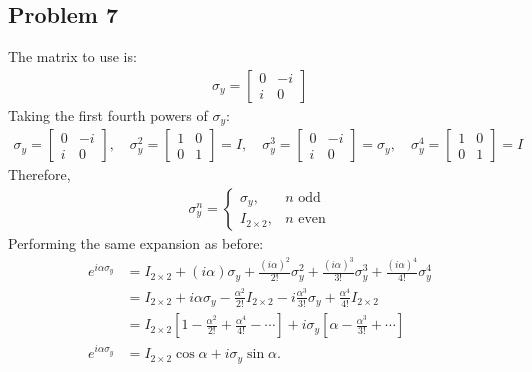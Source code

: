 \documentclass[letterpaper,11pt,twoside]{article}
\begin{document}
\subsection*{Problem 7}
The matrix to use is:
\begin{align*}
  \sigma_y=\begin{bmatrix}
    0&-i\\i&0
  \end{bmatrix}
\end{align*}
Taking the first fourth powers of $\sigma_y$:
\begin{align*}
\sigma_y=\begin{bmatrix}
  0&-i\\i&0
\end{bmatrix},\quad\sigma_y^2=\begin{bmatrix}
  1&0\\0&1
\end{bmatrix}=I,\quad\sigma_y^3=\begin{bmatrix}
  0&-i\\i&0
\end{bmatrix}=\sigma_y,\quad\sigma_y^4=\begin{bmatrix}
  1&0\\0&1
\end{bmatrix}=I
\end{align*}
Therefore,
\begin{align*}
  \sigma_y^n=\begin{cases}
    \sigma_y,&\text{$n$ odd}\\
    I_{2\times2},&\text{$n$ even}
  \end{cases}
\end{align*}
Performing the same expansion as before:
\begin{align*}
  e^{i\alpha\sigma_y}&=I_{2\times2}+(i\alpha)\sigma_y+\frac{(i\alpha)^2}{2!}\sigma_y^2+\frac{(i\alpha)^3}{3!}\sigma_y^3+\frac{(i\alpha)^4}{4!}\sigma_y^4\\
  &=I_{2\times2}+i\alpha\sigma_y-\frac{\alpha^2}{2!}I_{2\times2}-i\frac{\alpha^3}{3!}\sigma_y+\frac{\alpha^4}{4!}I_{2\times2}\\
  &=I_{2\times2}\left[1-\frac{\alpha^2}{2!}+\frac{\alpha^4}{4!}-\cdots\right]+i\sigma_y\left[\alpha-\frac{\alpha^3}{3!}+\cdots\right]\\
  e^{i\alpha\sigma_y}&=I_{2\times2}\cos\alpha+i\sigma_y\sin\alpha.
\end{align*}
\end{document}
